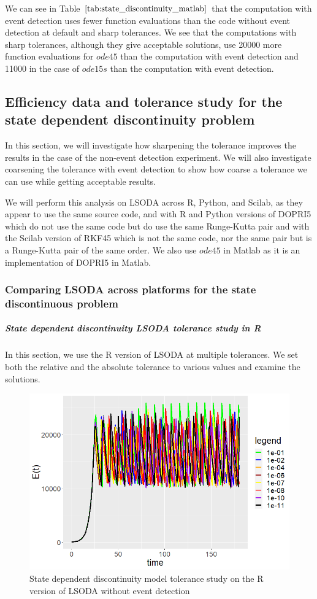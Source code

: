 We can see in Table $\ref{tab:state_discontinuity_matlab}$ that the computation with event detection uses fewer function evaluations than the code without event detection at default and sharp tolerances. We see that the computations with sharp tolerances, although they give acceptable solutions, use 20000 more function evaluations for $ode45$ than the computation with event detection and 11000 in the case of $ode15s$ than the computation with event detection.

\subsection{Efficiency data and tolerance study for the state dependent discontinuity problem}
\label{subsection:state_tolerance_study}
In this section, we will investigate how sharpening the tolerance improves the results in the case of the non-event detection experiment. We will also investigate coarsening the tolerance with event detection to show how coarse a tolerance we can use while getting acceptable results.

We will perform this analysis on LSODA across R, Python, and Scilab, as they appear to use the same source code, and with R and Python versions of DOPRI5 which do not use the same code but do use the same Runge-Kutta pair and with the Scilab version of RKF45 which is not the same code, nor the same pair but is a Runge-Kutta pair of the same order. We also use $ode45$ in Matlab as it is an implementation of DOPRI5 in Matlab. 

\subsubsection{Comparing LSODA across platforms for the state discontinuous problem}
\subparagraph{State dependent discontinuity LSODA tolerance study in R}
In this section, we use the R version of LSODA at multiple tolerances. We set both the relative and the absolute tolerance to various values and examine the solutions.

\begin{figure}[h]
\centering
\includegraphics[width=0.7\linewidth]{./figures/tolerance_state_lsoda_no_event_R}
\caption{State dependent discontinuity model tolerance study on the R version of LSODA without event detection}
\label{fig:tolerance_state_lsoda_no_event_R}
\end{figure}

